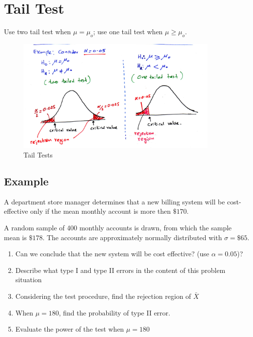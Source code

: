 \documentclass{article}
\begin{document}
        \section*{Tail Test}
        Use two tail test when $\mu = \mu_{o}$; use one tail test when $\mu \geq \mu_{o}$.
        \begin{figure}[H]
            \centering
            \includegraphics[width=10cm]{figures/tail_test.PNG}
            \caption{Tail Tests}
            \label{fig:tail_test}
        \end{figure}


        \subsection*{Example}
        A department store manager determines that a new billing system will be cost-effective 
        only if the mean monthly account is more then $\$170$.\par

        A random sample of 400 monthly accounts is drawn, from which the sample mean 
        is $\$178$. The accounts are approximately normally distributed with $\sigma = \$65$.

        \begin{enumerate}[label={(\alph*)}]
            \item Can we conclude that the new system will be cost effective? (use $\alpha = 0.05$)?
            \item Describe what type I and type II errors in the content of this problem situation
            \item Considering the test procedure, find the rejection region of $\bar{X}$
            \item When $\mu = 180$, find the probability of type II error.
            \item Evaluate the power of the test when $\mu = 180$
        \end{enumerate}
\end{document}
